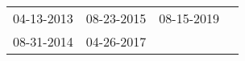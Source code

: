 \begin{supertabular}{llll}
 04-13-2013 &  08-23-2015 &  08-15-2019 \\
 08-31-2014 &  04-26-2017 &             \\
\end{supertabular}
